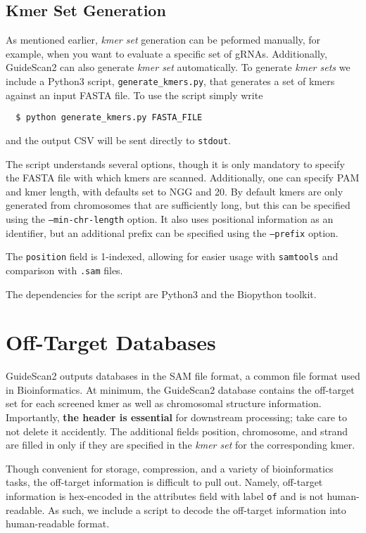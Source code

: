 \documentclass[10pt]{article}
\begin{document}
\subsection{Kmer Set Generation}
As mentioned earlier, {\it kmer set} generation can be peformed manually,
for example, when you want to evaluate a specific set of gRNAs.
Additionally, GuideScan2 can also generate {\it kmer set} automatically.
To generate {\it kmer sets} we include a Python3 script,
\texttt{generate\_kmers.py}, that generates a set of kmers against an
input FASTA file. To use the script simply write
\begin{verbatim}
  $ python generate_kmers.py FASTA_FILE 
\end{verbatim}
and the output CSV will be sent directly to \texttt{stdout}.

The script understands several options, though it is only mandatory to
specify the FASTA file with which kmers are scanned. Additionally, one
can specify PAM and kmer length, with defaults set to NGG and 20. By
default kmers are only generated from chromosomes that are
sufficiently long, but this can be specified using the
\texttt{--min-chr-length} option. It also uses positional information
as an identifier, but an additional prefix can be specified using the
\texttt{--prefix} option.

The \texttt{position} field is 1-indexed, allowing for easier usage
with \texttt{samtools} and comparison with \texttt{.sam} files.
 
The dependencies for the script are Python3 and the Biopython toolkit.

\section{Off-Target Databases}
GuideScan2 outputs databases in the SAM file format, a common file
format used in Bioinformatics. At minimum, the GuideScan2 database
contains the off-target set for each screened kmer as well as
chromosomal structure information. Importantly, \textbf{the header is
  essential} for downstream processing; take care to not delete it
accidently. The additional fields position, chromosome, and strand are
filled in only if they are specified in the {\it kmer set} for the
corresponding kmer. 

Though convenient for storage, compression, and a variety of
bioinformatics tasks, the off-target information is difficult to pull
out. Namely, off-target information is hex-encoded in the attributes
field with label \texttt{of} and is not human-readable. As such, we
include a script to decode the off-target information into
human-readable format.
\end{document}
